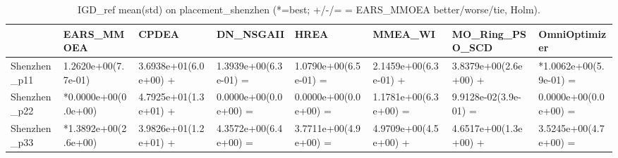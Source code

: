 \begin{table}[t]
\centering
\caption{IGD_ref mean(std) on placement_shenzhen (*=best; +/-/= = EARS_MMOEA better/worse/tie, Holm).}
\label{tab:placement_shenzhen_IGD_ref}
\begin{tabular}{llllllll}
\toprule
 & EARS\_MMOEA & CPDEA & DN\_NSGAII & HREA & MMEA\_WI & MO\_Ring\_PSO\_SCD & OmniOptimizer \\
\midrule
Shenzhen\_p11 & 1.2620e+00(7.7e-01) & 3.6938e+01(6.0e+00) + & 1.3939e+00(6.3e-01) = & 1.0790e+00(6.5e-01) = & 2.1459e+00(6.3e-01) + & 3.8379e+00(2.6e+00) + & *1.0062e+00(5.9e-01) = \\
Shenzhen\_p22 & *0.0000e+00(0.0e+00) & 4.7925e+01(1.3e+01) + & 0.0000e+00(0.0e+00) = & 0.0000e+00(0.0e+00) = & 1.1781e+00(6.3e+00) = & 9.9128e-02(3.9e-01) = & 0.0000e+00(0.0e+00) = \\
Shenzhen\_p33 & *1.3892e+00(2.6e+00) & 3.9826e+01(1.2e+01) + & 4.3572e+00(6.4e+00) = & 3.7711e+00(4.9e+00) = & 4.9709e+00(4.5e+00) + & 4.6517e+00(1.3e+00) + & 3.5245e+00(4.7e+00) = \\
\bottomrule
\end{tabular}
\end{table}

